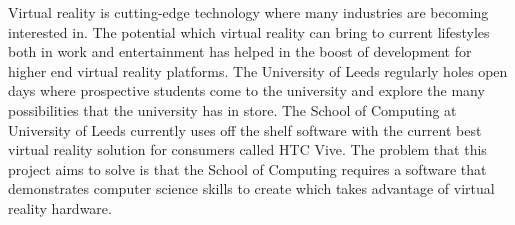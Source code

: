 Virtual reality is cutting-edge technology where many industries are becoming interested in. The potential which virtual reality can bring to current lifestyles both in work and entertainment has helped in the boost of development for higher end virtual reality platforms. The University of Leeds regularly holes open days where prospective students come to the university and explore the many possibilities that the university has in store. The School of Computing at University of Leeds currently uses off the shelf software  with the current best virtual reality solution for consumers called HTC Vive. The problem that this project aims to solve is that the School of Computing requires a software that demonstrates computer science skills to create which takes advantage of virtual reality hardware.